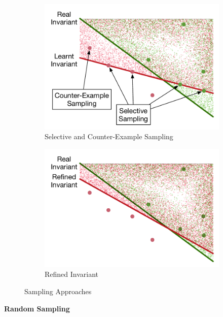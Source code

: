 \begin{figure}[t]
\begin{subfigure}{0.23\textwidth}
        \includegraphics[scale=0.3]{figures/general-sampling-2.pdf}
        \caption{Selective and Counter-Example Sampling}
        \label{fig:sampling:selective}
    \end{subfigure}
    \begin{subfigure}{0.23\textwidth}
        \centering
        \includegraphics[scale=0.3]{figures/general-sampling-3.pdf}
        \caption{Refined Invariant}
        \label{fig:sampling:selective:invariant}
    \end{subfigure}
    \caption{Sampling Approaches}
    \label{fig:sampling}
\end{figure}

\medskip\noindent
\textbf{Random Sampling} 

